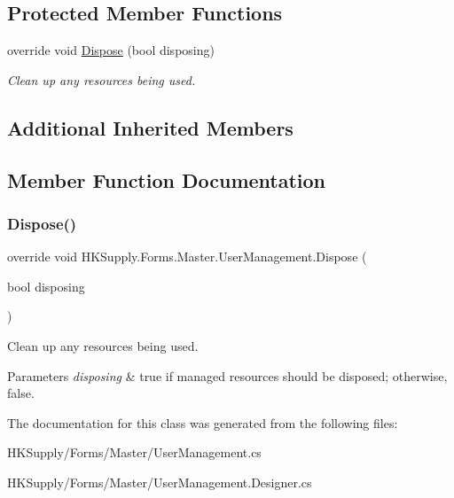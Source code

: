 \subsection*{Protected Member Functions}
\begin{DoxyCompactItemize}
\item 
override void \mbox{\hyperlink{class_h_k_supply_1_1_forms_1_1_master_1_1_user_management_a785e8f8b502b3ac465677f0817b29023}{Dispose}} (bool disposing)
\begin{DoxyCompactList}\small\item\em Clean up any resources being used. \end{DoxyCompactList}\end{DoxyCompactItemize}
\subsection*{Additional Inherited Members}


\subsection{Member Function Documentation}
\mbox{\label{class_h_k_supply_1_1_forms_1_1_master_1_1_user_management_a785e8f8b502b3ac465677f0817b29023}} 
\subsubsection{\texorpdfstring{Dispose()}{Dispose()}}
{\footnotesize\ttfamily override void H\+K\+Supply.\+Forms.\+Master.\+User\+Management.\+Dispose (\begin{DoxyParamCaption}\item[{bool}]{disposing }\end{DoxyParamCaption})\hspace{0.3cm}{\ttfamily [protected]}}



Clean up any resources being used. 


\begin{DoxyParams}{Parameters}
{\em disposing} & true if managed resources should be disposed; otherwise, false.\\
\hline
\end{DoxyParams}


The documentation for this class was generated from the following files\+:\begin{DoxyCompactItemize}
\item 
H\+K\+Supply/\+Forms/\+Master/User\+Management.\+cs\item 
H\+K\+Supply/\+Forms/\+Master/User\+Management.\+Designer.\+cs\end{DoxyCompactItemize}
